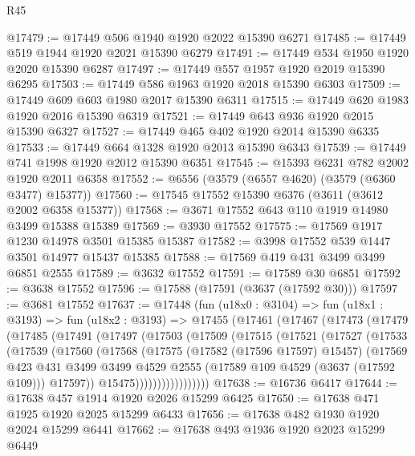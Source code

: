 \begin{lexlean}{R45}
\begin{coremodule}
@17479 := @17449 @506 @1940 @1920 @2022 @15390 @6271
@17485 := @17449 @519 @1944 @1920 @2021 @15390 @6279
@17491 := @17449 @534 @1950 @1920 @2020 @15390 @6287
@17497 := @17449 @557 @1957 @1920 @2019 @15390 @6295
@17503 := @17449 @586 @1963 @1920 @2018 @15390 @6303
@17509 := @17449 @609 @603 @1980 @2017 @15390 @6311
@17515 := @17449 @620 @1983 @1920 @2016 @15390 @6319
@17521 := @17449 @643 @936 @1920 @2015 @15390 @6327
@17527 := @17449 @465 @402 @1920 @2014 @15390 @6335
@17533 := @17449 @664 @1328 @1920 @2013 @15390 @6343
@17539 := @17449 @741 @1998 @1920 @2012 @15390 @6351
@17545 := @15393 @6231 @782 @2002 @1920 @2011 @6358
@17552 := @6556 (@3579 (@6557 @4620) (@3579 (@6360 @3477) @15377))
@17560 := @17545 @17552 @15390 @6376 (@3611 (@3612 @2002 @6358 @15377))
@17568 := @3671 @17552 @643 @110 @1919 @14980 @3499 @15388 @15389
@17569 := @3930 @17552
@17575 := @17569 @1917 @1230 @14978 @3501 @15385 @15387
@17582 := @3998 @17552 @539 @1447 @3501 @14977 @15437 @15385
@17588 := @17569 @419 @431 @3499 @3499 @6851 @2555
@17589 := @3632 @17552
@17591 := @17589 @30 @6851
@17592 := @3638 @17552
@17596 := @17588 (@17591 (@3637 (@17592 @30)))
@17597 := @3681 @17552
@17637 := @17448
    (fun (u18x0 : @3104) =>
    fun (u18x1 : @3193) =>
    fun (u18x2 : @3193) =>
    @17455
      (@17461
        (@17467
          (@17473
            (@17479
              (@17485
                (@17491
                  (@17497
                    (@17503
                      (@17509
                        (@17515
                          (@17521
                            (@17527
                              (@17533
                                (@17539
                                  (@17560
                                    (@17568
                                      (@17575
                                        (@17582 (@17596 @17597) @15457)
                                        (@17569
                                          @423
                                          @431
                                          @3499
                                          @3499
                                          @4529
                                          @2555
                                          (@17589 @109 @4529 (@3637 (@17592 @109)))
                                          @17597))
                                      @15475)))))))))))))))))
@17638 := @16736 @6417
@17644 := @17638 @457 @1914 @1920 @2026 @15299 @6425
@17650 := @17638 @471 @1925 @1920 @2025 @15299 @6433
@17656 := @17638 @482 @1930 @1920 @2024 @15299 @6441
@17662 := @17638 @493 @1936 @1920 @2023 @15299 @6449

\end{coremodule}
\end{lexlean}
